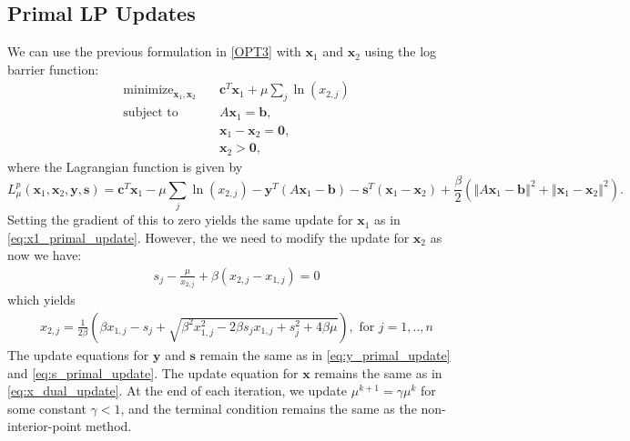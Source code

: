 \documentclass{article}
\begin{document}
\subsection*{Primal LP Updates}
We can use the previous formulation in \eqref{OPT3} with  $\mathbf{x}_{1}$ and $\mathbf{x}_{2}$ using the log barrier function:
\begin{align}
\text{minimize}_{ \mathbf{x}_{1}, \mathbf{x}_{2}} &\quad \mathbf{c}^T\mathbf{x}_1 + \mu \sum_j \ln( {x}_{2,j} )\tag{OPT5}\label{OPT5} \\
\text{subject to  \ \  } &\quad  A \mathbf{x}_{1} = \mathbf{b},  \nonumber \\
&\quad \mathbf{x}_{1}  - \mathbf{x}_{2} = \mathbf{0}, \nonumber \\
&\quad \mathbf{x}_{2} > \mathbf{0}, \nonumber 
\end{align}
where the Lagrangian function is given by
\[
L_{\mu}^{p}(\mathbf{x}_{1},\mathbf{x}_{2},\mathbf{y}, \mathbf{s})=\mathbf{c}^{T}\mathbf{x}_{1}-\mu\sum_{j}\ln\left(x_{2,j}\right)-\mathbf{y}^{T}\left(A\mathbf{x}_{1}-\mathbf{b}\right)-\mathbf{s}^{T}\left(\mathbf{x}_{1}-\mathbf{x}_{2}\right)+\frac{\beta}{2}\left(\left\Vert A\mathbf{x}_{1}-\mathbf{b}\right\Vert ^{2}+\left\Vert \mathbf{x}_{1}-\mathbf{x}_{2}\right\Vert ^{2}\right).
\]
Setting the gradient of this to zero yields the same update for $\mathbf{x}_1$ as in \eqref{eq:x1_primal_update}.
However, the we need to modify the update for $\mathbf{x}_2$ as now we have:
\begin{align}
s_j - \frac{\mu}{x_{2,j}} + \beta(x_{2,j} - x_{1,j}) = 0
\end{align}
which yields 
\begin{align}
x_{2,j} = \frac{1}{2\beta}\left(\beta x_{1,j} - s_j  + \sqrt{\beta^2 x_{1,j}^2 - 2\beta s_j x_{1,j} + s_j^2 + 4\beta\mu } \right), \text{ for $j = 1,..,n$}
\end{align}
The update equations for $\mathbf{y}$ and $\mathbf{s}$ remain the same as in \eqref{eq:y_primal_update} and \eqref{eq:s_primal_update}. 
The update equation for $\mathbf{x}$ remains the same as in \eqref{eq:x_dual_update}. At the end of each iteration, we update $\mu^{k+1} = \gamma \mu^k$ for some constant $\gamma<1$, and the terminal condition remains the same as the non-interior-point method. 

\vspace{0.1in}
\end{document}
